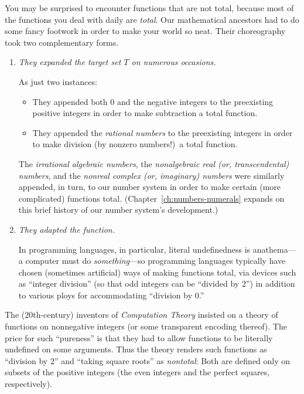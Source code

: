
\medskip

You may be surprised to encounter functions that are not total, because most of the functions you deal with daily are {\em total}.  Our mathematical ancestors had to do some fancy footwork in order to make your world so neat.  Their choreography took two complementary forms.
\begin{enumerate}
\item
{\em They expanded the target set $T$ on numerous occasions.}

\smallskip

As just two instances:
  \begin{itemize}
  \item
They appended both $0$ and the negative integers to the preexisting positive integers in order to make subtraction a total function.

  \medskip\item
They appended the {\it rational numbers} to the preexisting integers in order to make division (by nonzero numbers!)~a total function.
  \end{itemize}
The {\it irrational algebraic numbers}, the {\it nonalgebraic real (or, transcendental) numbers}, and the {\it nonreal complex (or, imaginary) numbers} were similarly appended, in turn, to our number system in order to make certain (more complicated) functions total.  (Chapter~\ref{ch:numbers-numerals} expands on this brief history of our number system's development.)

\medskip\item
{\em They adapted the function.}

\smallskip

In programming languages, in particular, literal undefinedness is anathema---a computer must do {\em something}---so programming languages typically have chosen (sometimes artificial) ways of making functions total, via devices such as ``integer division'' (so that odd integers can be ``divided by $2$'') in addition to various ploys for accommodating ``division by $0$.''
\end{enumerate}
The ($20$th-century) inventors of {\em Computation Theory} insisted on a theory of functions on nonnegative integers (or some transparent encoding thereof).  The price for such ``pureness'' is that they had to allow functions to be literally undefined on some arguments.  Thus the theory renders such functions as ``division by $2$'' and ``taking square roots'' as {\em nontotal}: Both are defined only on subsets of the positive integers (the even integers and the perfect squares, respectively).


